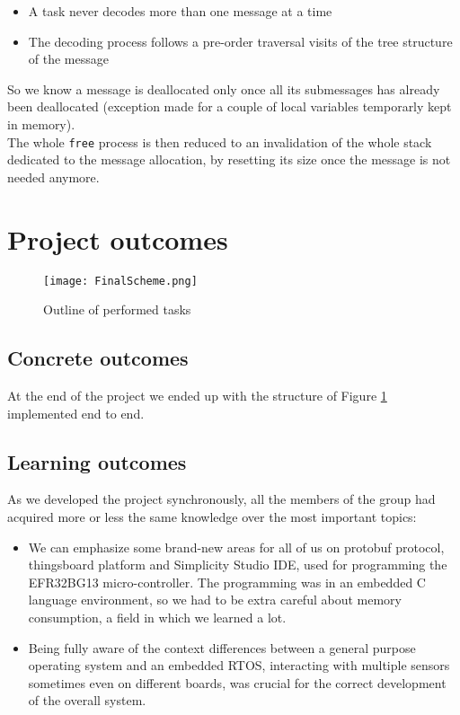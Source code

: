 \documentclass[10pt,a4]{article}
\begin{document}
\begin{itemize}
\item
A task never decodes more than one message at a time
\item 
The decoding process follows a pre-order traversal visits of the tree structure of the message
\end{itemize}
So we know a message is deallocated only once all its submessages has already been deallocated (exception made for a couple of local variables temporarly kept in memory).\\
The whole \texttt{free} process is then reduced to an invalidation of the whole stack dedicated to the message allocation, by resetting its size once the message is not needed anymore.

\section{Project outcomes}

\begin{figure}[h]
    \centering
    \texttt{[image: FinalScheme.png]}
    \caption{Outline of performed tasks}
    \label{fig:final}
\end{figure}


\subsection{Concrete outcomes}


At the end of the project we ended up with the  structure of Figure \ref{fig:final} implemented end to end.



\subsection{Learning outcomes}

As we developed the project synchronously, all the members of the group had acquired more or less the same knowledge over the most important topics:

\begin{itemize}

\item
We can emphasize some brand-new areas for all of us on protobuf protocol, thingsboard platform and Simplicity Studio IDE, used for programming the EFR32BG13 micro-controller. The programming was in an embedded C language environment, so we had to be extra careful about memory consumption, a field in which we learned a lot.

\item
Being fully aware of the context differences between a general purpose operating system and an embedded RTOS, interacting with multiple sensors sometimes even on different boards, was crucial for the correct development of the overall system.

\end{itemize}
\end{document}
